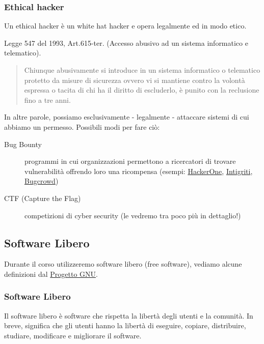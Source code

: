 \documentclass{beamer}
\begin{document}
\subsubsection*{Ethical hacker}
\begin{frame}[allowframebreaks]{\insertsubsection}{\insertsubsubsection}
Un \alert{ethical hacker} è un \alert{white hat hacker} e opera legalmente ed in
modo etico.

\begin{alertblock}{Legge 547 del 1993, Art.615-ter. (Accesso abusivo ad
un sistema informatico e telematico).}
\begin{quote}
Chiunque abusivamente si introduce in un sistema informatico o
telematico protetto da misure di sicurezza ovvero vi si mantiene contro
la volontà espressa o tacita di chi ha il diritto di escluderlo, è
punito con la reclusione fino a tre anni.
\end{quote}
\end{alertblock}

In altre parole, possiamo esclusivamente - legalmente - attaccare sistemi
di cui abbiamo un permesso. Possibili modi per fare ciò:

\begin{description}
\item[Bug Bounty] programmi in cui organizzazioni permettono a ricercatori di
trovare vulnerabilità offrendo loro una ricompensa (esempi:
\href{https://www.hackerone.com/}{HackerOne},
\href{https://www.intigriti.com/}{Intigriti},
\href{https://www.bugcrowd.com/}{Bugcrowd})
\item[CTF (Capture the Flag)] competizioni di cyber security (le vedremo tra
poco più in dettaglio!)
\end{description}
\end{frame}

\subsection{Software Libero}
\begin{frame}{\insertsubsection}
Durante il corso utilizzeremo \alert{software libero} (\alert{free
software}), vediamo alcune definizioni dal
\href{https://www.gnu.org/philosophy/free-sw.it.html}{Progetto GNU}.
\end{frame}

\subsubsection*{Software Libero}
\begin{frame}{\insertsubsection}{\insertsubsubsection}
\begin{block}{\insertsubsubsection}
Il \alert{software libero} è software che rispetta la libertà degli
utenti e la comunità. In breve, significa che \alert{gli utenti hanno la
libertà di eseguire, copiare, distribuire, studiare, modificare e
migliorare il software}.
\end{block}
\end{frame}
\end{document}
